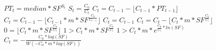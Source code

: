 $PT_{ t }=median*SF^{ S_{ t } }$
$S_{ t }=\frac{ C_{ 0 } }{ C_{ t } }$
$C_{ t }=C_{ t-1 } - \lfloor C_{ t-1 } * PT_{ t-1 } \rfloor$
$C_{ t }=C_{ t-1 } - \lfloor C_{ t-1 } * m * SF^{ \frac{ C_{ 0 } }{ C_{ t-1 } } } \rfloor$
$C_{ t }=C_{ t-1 }$
$C_{ t }=C_{ t } - \lfloor C_{ t } * m * SF^{ \frac{ C_{ 0 } }{ C_{ t } } } \rfloor$
$0=\lfloor C_{ t } * m * SF^{ \frac{ C_{ 0 } }{ C_{ t } } } \rfloor$
$1 > C_{ t } * m * SF^{ \frac{ C_{ 0 } }{ C_{ t } } }$
$1 > C_{ t } * m * e^{ \frac{ C_{ 0 } }{ C_{ t } } * ln\left( SF \right) }$
$C_{ t } = - \frac{ C_{ 0 }* log\left( SF \right) }{ W\left( -C_{ 0 } * m * log\left( SF \right) \right) }$